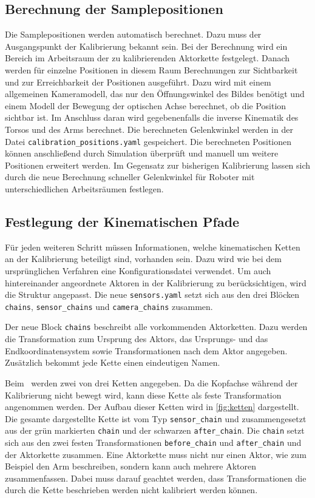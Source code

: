 \subsection{Berechnung der Samplepositionen}
\label{sub:Berechnung der Samplepositionen}
Die Samplepositionen werden automatisch berechnet. Dazu muss der Ausgangspunkt 
der Kalibrierung bekannt sein. Bei der Berechnung wird ein Bereich im Arbeitsraum
der zu kalibrierenden Aktorkette festgelegt. Danach werden für einzelne
Positionen in diesem Raum Berechnungen zur Sichtbarkeit und zur Erreichbarkeit 
der Positionen ausgeführt. Dazu wird mit einem allgemeinen Kameramodell, das nur
den Öffnungswinkel des Bildes benötigt und einem Modell der Bewegung der 
optischen Achse berechnet, ob die Position sichtbar ist. Im Anschluss daran wird
gegebenenfalls die inverse Kinematik des Torsos und des Arms berechnet. Die 
berechneten Gelenkwinkel werden in der Datei \texttt{calibration\_positions.yaml}
gespeichert. Die berechneten Positionen können anschließend durch Simulation
überprüft und manuell um weitere Positionen erweitert werden. Im Gegensatz zur 
bisherigen Kalibrierung lassen sich durch die neue Berechnung schneller
Gelenkwinkel für Roboter mit unterschiedlichen Arbeitsräumen festlegen. 

\subsection{Festlegung der Kinematischen Pfade}
\label{sub:Festlegung der Kinematischen Pfade}
Für jeden weiteren Schritt müssen Informationen, welche
kinematischen Ketten an der Kalibrierung beteiligt sind, vorhanden sein.
Dazu wird wie bei dem 
ursprünglichen Verfahren eine Konfigurationsdatei verwendet. Um auch 
hintereinander angeordnete Aktoren in der Kalibrierung zu berücksichtigen, wird 
die Struktur angepasst. Die neue \texttt{sensors.yaml} setzt sich aus den drei
Blöcken \texttt{chains}, \texttt{sensor\_chains} und \texttt{camera\_chains}
zusammen.

Der neue Block \texttt{chains} beschreibt alle vorkommenden Aktorketten. Dazu 
werden die Transformation zum Ursprung des Aktors, das Ursprungs- und das 
Endkoordinatensystem sowie Transformationen nach dem Aktor angegeben. Zusätzlich
bekommt jede Kette einen eindeutigen Namen.

Beim \cob\ werden zwei von drei Ketten angegeben. Da die Kopfachse während der
Kalibrierung nicht bewegt wird, kann diese Kette als feste Transformation 
angenommen werden. Der Aufbau dieser Ketten wird in \ref{fig:ketten}
dargestellt. Die gesamte dargestellte Kette ist vom Typ \texttt{sensor\_chain}
und zusammengesetzt aus der grün markierten \texttt{chain} und der schwarzen 
  \texttt{after\_chain}. Die \texttt{chain} setzt sich aus den zwei festen 
  Transformationen \texttt{before\_chain} und \texttt{after\_chain} und der Aktorkette zusammen.
  Eine Aktorkette muss nicht nur einen Aktor, wie zum Beispiel den Arm
  beschreiben, sondern kann auch mehrere Aktoren zusammenfassen. Dabei muss 
  darauf geachtet werden, dass Transformationen die durch die Kette beschrieben
  werden nicht kalibriert werden können.

